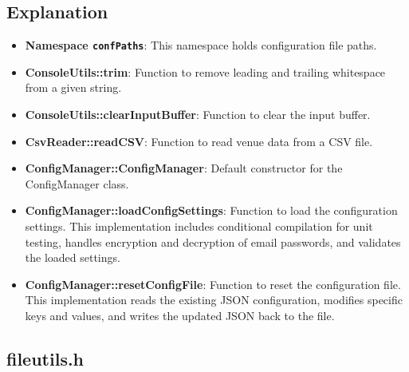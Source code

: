 \documentclass{article}
\begin{document}
	\subsection*{Explanation}
	\begin{itemize}
		\item \textbf{Namespace \texttt{confPaths}}: This namespace holds configuration file paths.
		\item \textbf{ConsoleUtils::trim}: Function to remove leading and trailing whitespace from a given string.
		\item \textbf{ConsoleUtils::clearInputBuffer}: Function to clear the input buffer.
		\item \textbf{CsvReader::readCSV}: Function to read venue data from a CSV file.
		\item \textbf{ConfigManager::ConfigManager}: Default constructor for the ConfigManager class.
		\item \textbf{ConfigManager::loadConfigSettings}: Function to load the configuration settings. This implementation includes conditional compilation for unit testing, handles encryption and decryption of email passwords, and validates the loaded settings.
		\item \textbf{ConfigManager::resetConfigFile}: Function to reset the configuration file. This implementation reads the existing JSON configuration, modifies specific keys and values, and writes the updated JSON back to the file.
	\end{itemize}
	
	\subsection{fileutils.h}
	
\end{document}
